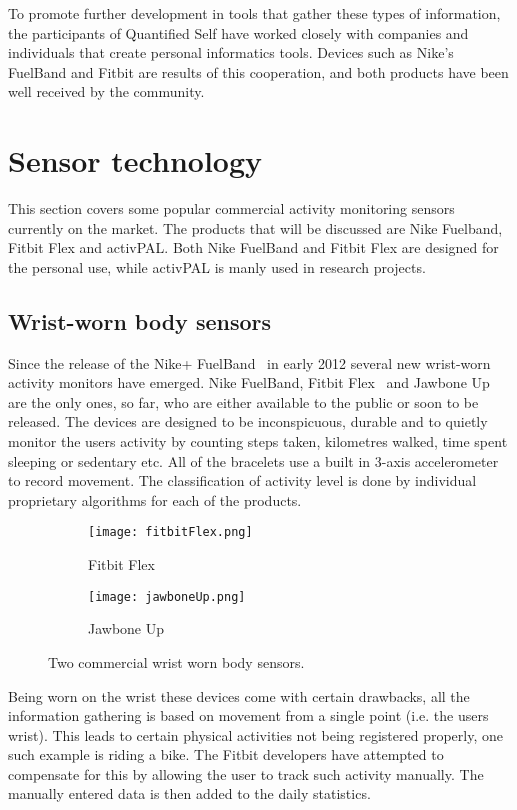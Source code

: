 To promote further development in tools that gather these types of information, the participants of Quantified Self have worked closely with companies and individuals that create personal informatics tools. Devices such as Nike's FuelBand and Fitbit are results of this cooperation, and both products have been well received by the community.

\section{Sensor technology}
This section covers some popular commercial activity monitoring sensors currently on the market. The products that will be discussed are Nike Fuelband, Fitbit Flex and activPAL. Both Nike FuelBand and Fitbit Flex are designed for the personal use, while activPAL is manly used in research projects.

\subsection{Wrist-worn body sensors}
Since the release of the Nike+ FuelBand~\cite{fuelBand} in early 2012 several new wrist-worn activity monitors have emerged. Nike FuelBand, Fitbit Flex~\cite{flex} and Jawbone Up~\cite{jawboneUp} are the only ones, so far, who are either available to the public or soon to be released. The devices are designed to be inconspicuous, durable and to quietly monitor the users activity by counting steps taken, kilometres walked, time spent sleeping or sedentary etc. All of the bracelets use a built in 3-axis accelerometer to record movement. The classification of activity level is done by individual proprietary algorithms for each of the products.

\begin{figure}[h!]
  \centering
  \begin{subfigure}[b]{0.3\textwidth}
    \centering
    \texttt{[image: fitbitFlex.png]}
    \caption{Fitbit Flex}
    \label{fig:fitbitFlex}
  \end{subfigure}
  \begin{subfigure}[b]{0.4\textwidth}
    \centering
    \texttt{[image: jawboneUp.png]}
    \caption{Jawbone Up}
    \label{fig:jawboneUp}
  \end{subfigure}
  \caption{Two commercial wrist worn body sensors.}
\end{figure}

Being worn on the wrist these devices come with certain drawbacks, all the information gathering is based on movement from a single point (i.e. the users wrist). This leads to certain physical activities not being registered properly, one such example is riding a bike. The Fitbit developers have attempted to compensate for this by allowing the user to track such activity manually. The manually entered data is then added to the daily statistics. 

